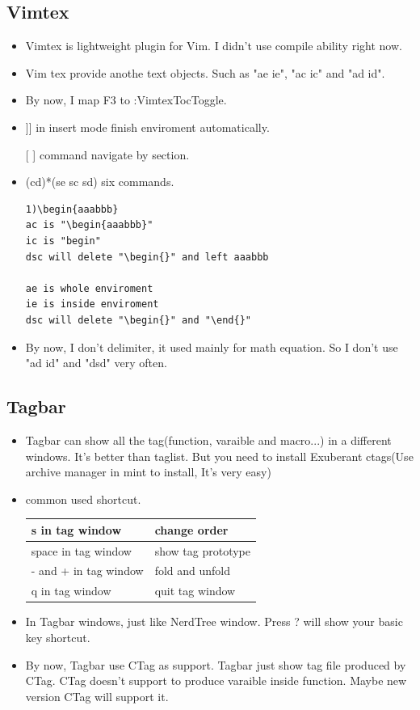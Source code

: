 \documentclass[a4paper,12pt,twoside]{book}
\begin{document}
\subsection{Vimtex}
\begin{itemize}
		\item Vimtex is lightweight plugin for Vim. I didn't use compile ability right now. 
		\item Vim tex provide anothe text objects. Such as "ae ie", "ac ic" and "ad id". 
		\item By now, I map F3 to :VimtexTocToggle.
		\item ]] in insert mode finish enviroment automatically.
		\item [[ ]] command navigate by section.
		\item (cd)*(se sc sd) six commands. 
\begin{verbatim}
1)\begin{aaabbb}
ac is "\begin{aaabbb}"
ic is "begin"
dsc will delete "\begin{}" and left aaabbb

ae is whole enviroment
ie is inside enviroment
dsc will delete "\begin{}" and "\end{}" 
\end{verbatim}
	\item By now, I don't delimiter, it used mainly for math equation. So I don't use "ad id" and "dsd" very often. 
			\end{itemize}

\subsection{Tagbar}

\begin{itemize}
\item Tagbar can show all the tag(function, varaible and macro...) in a different windows. It's better than taglist. But you need to install Exuberant ctags(Use archive manager in mint to install, It's very easy)

\item common used shortcut.		
\begin{tabular}{|p{}|p{}|}
\hline 
s in tag window & change order \\ 
\hline 
space in tag window & show tag prototype  \\ 
\hline 
- and + in tag window & fold and unfold \\ 
\hline 
q in tag window & quit tag window \\ 
\hline 
\end{tabular}
\item In Tagbar windows, just like NerdTree window. Press ? will show your basic key shortcut. 
\item By now, Tagbar use CTag as support. Tagbar just show tag file produced by CTag. CTag doesn't support to produce varaible inside function. Maybe new version CTag will support it. 
		
\end{itemize}
\end{document}
